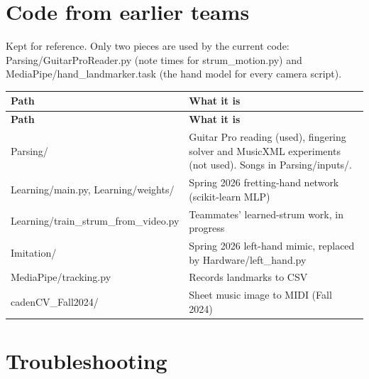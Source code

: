 \documentclass[11pt,letterpaper]{article}
\newcommand{\code}[1]{\textcolor{codeblue}{\ttfamily\smaller\relax #1}}
\begin{document}
\section{Code from earlier teams}
Kept for reference. Only two pieces are used by the current code: \code{Parsing/\allowbreak{}GuitarProReader.py} (note times for \code{strum\_\allowbreak{}motion.py}) and \code{MediaPipe/\allowbreak{}hand\_\allowbreak{}landmarker.task} (the hand model for every camera script).

{\small
\begin{longtable}{|>{\raggedright\arraybackslash}p{}|>{\raggedright\arraybackslash}p{}|}
\hline
\rowcolor{tblhead}\textbf{Path} & \textbf{What it is} \\ \hline
\endfirsthead
\hline
\rowcolor{tblhead}\textbf{Path} & \textbf{What it is} \\ \hline
\endhead
\code{Parsing/\allowbreak{}} & Guitar Pro reading (used), fingering solver and MusicXML experiments (not used). Songs in \code{Parsing/\allowbreak{}inputs/\allowbreak{}}. \\ \hline
\code{Learning/\allowbreak{}main.py}, \code{Learning/\allowbreak{}weights/\allowbreak{}} & Spring 2026 fretting-hand network (scikit-learn MLP) \\ \hline
\code{Learning/\allowbreak{}train\_\allowbreak{}strum\_\allowbreak{}from\_\allowbreak{}video.py} & Teammates' learned-strum work, in progress \\ \hline
\code{Imitation/\allowbreak{}} & Spring 2026 left-hand mimic, replaced by \code{Hardware/\allowbreak{}left\_\allowbreak{}hand.py} \\ \hline
\code{MediaPipe/\allowbreak{}tracking.py} & Records landmarks to CSV \\ \hline
\code{cadenCV\_\allowbreak{}Fall2024/\allowbreak{}} & Sheet music image to MIDI (Fall 2024) \\ \hline
\end{longtable}}


\section{Troubleshooting}
\end{document}
